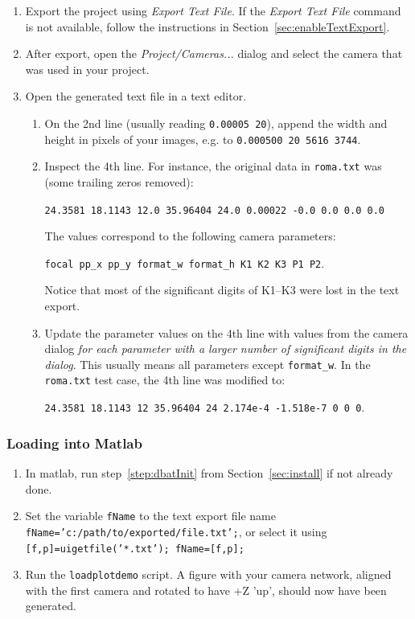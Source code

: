 \documentclass{article}
\begin{document}
\begin{enumerate}
\item Export the project using \emph{Export Text File}. If the
  \emph{Export Text File} command is not available, follow the
  instructions in Section~\ref{sec:enableTextExport}.
\item After export, open the \emph{Project/Cameras...} dialog and
  select the camera that was used in your project.
\item Open the generated text file in a text editor.
  \begin{enumerate}
  \item On the 2nd line (usually reading \texttt{0.00005 20}), append
    the width and height in pixels of your images, e.g. to
    \texttt{0.000500 20 5616 3744}.
  \item Inspect the 4th line. For instance,
    the original data in \texttt{roma.txt} was (some trailing zeros removed):

    \texttt{24.3581 18.1143 12.0 35.96404 24.0 0.00022 -0.0 0.0 0.0 0.0}

    The values correspond to the following camera parameters:

    \texttt{focal pp\_x pp\_y format\_w format\_h K1 K2 K3 P1 P2}.

    Notice that most of the significant digits of K1--K3 were lost in
    the text export.
  \item Update the parameter values on the 4th line with values from
    the camera dialog \emph{for each parameter with a larger number of
      significant digits in the dialog}. This usually means all
    parameters except \texttt{format\_w}. In the \texttt{roma.txt}
    test case, the 4th line was modified to:

    \texttt{24.3581 18.1143 12 35.96404 24 2.174e-4 -1.518e-7 0 0 0}.

  \end{enumerate}
\end{enumerate}

\subsubsection{Loading into Matlab}

\begin{enumerate}
\item In matlab, run step~\ref{step:dbatInit} from
  Section~\ref{sec:install} if not already done.
\item \sloppy Set the variable \texttt{fName} to the text export file name \texttt{fName='c:/path/to/exported/file.txt';}, or
  select it using \texttt{[f,p]=uigetfile('*.txt'); fName=[f,p];}
\item Run the \texttt{loadplotdemo} script. A figure with your camera
  network, aligned with the first camera and rotated to have +Z 'up',
  should now have been generated.
\end{enumerate}
\end{document}
